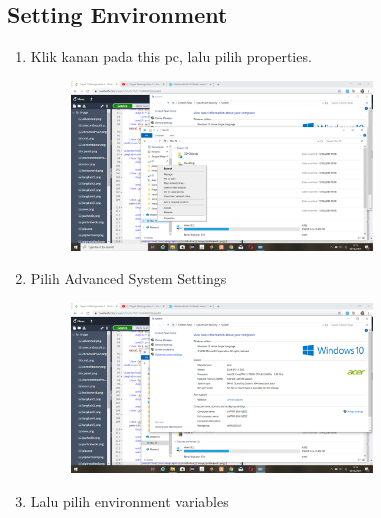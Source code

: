 \documentclass{article}
\begin{document}
\subsection{Setting Environment}
\begin{enumerate}
    \item Klik kanan pada this pc, lalu pilih properties.
        \begin{figure}[h]
            \centerline{\includegraphics[width=8cm]{image/properties.png}}
        \end{figure}
    \item Pilih Advanced System Settings
        \begin{figure}[h]
            \centerline{\includegraphics[width=8cm]{image/advancedsys.png}}
        \end{figure}
    \item Lalu pilih environment variables

\end{enumerate}
\end{document}
